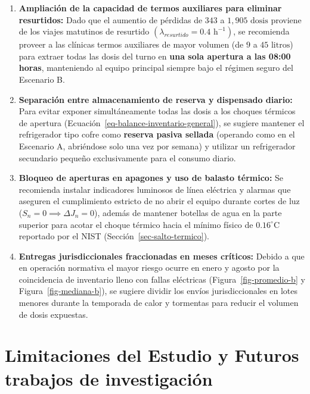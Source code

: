 \documentclass[
  spanish,
  us-letterpaper,
]{scrreprt}
\providecommand{\tightlist}{%
  \setlength{\itemsep}{0pt}\setlength{\parskip}{0pt}}
\numberwithin{equation}{section}
\theoremstyle{plain}
\theoremstyle{plain}
\theoremstyle{definition}
\theoremstyle{plain}
\theoremstyle{remark}
\begin{document}
\begin{enumerate}
\def\labelenumi{\arabic{enumi}.}
\tightlist
\item
  \textbf{Ampliación de la capacidad de termos auxiliares para eliminar
  resurtidos:} Dado que el aumentio de pérdidas de \(343\) a
  \(1,905\text{ dosis}\) proviene de los viajes matutinos de resurtido
  \(\left( \lambda_{resurtido} = 0.4\text{ h}^{-1} \right)\), se
  recomienda proveer a las clínicas termos auxiliares de mayor volumen
  (de \(9\) a \(45\text{ litros}\)) para extraer todas las dosis del
  turno en \textbf{una sola apertura a las 08:00 horas}, manteniendo al
  equipo principal siempre bajo el régimen seguro del Escenario B.
\item
  \textbf{Separación entre almacenamiento de reserva y dispensado
  diario:} Para evitar exponer simultáneamente todas las dosis a los
  choques térmicos de apertura
  (Ecuación~\ref{eq-balance-inventario-general}), se sugiere mantener el
  refrigerador tipo cofre como \textbf{reserva pasiva sellada} (operando
  como en el Escenario A, abriéndose solo una vez por semana) y utilizar
  un refrigerador secundario pequeño exclusivamente para el consumo
  diario.
\item
  \textbf{Bloqueo de aperturas en apagones y uso de balasto térmico:} Se
  recomienda instalar indicadores luminosos de línea eléctrica y alarmas
  que aseguren el cumplimiento estricto de no abrir el equipo durante
  cortes de luz (\(S_n = 0 \implies \Delta J_n = 0\)), además de
  mantener botellas de agua en la parte superior para acotar el choque
  térmico hacia el mínimo físico de \(0.16^\circ\text{C}\) reportado por
  el NIST (Sección~\ref{sec-salto-termico}).
\item
  \textbf{Entregas jurisdiccionales fraccionadas en meses críticos:}
  Debido a que en operación normativa el mayor riesgo ocurre en enero y
  agosto por la coincidencia de inventario lleno con fallas eléctricas
  (Figura~\ref{fig-promedio-b} y Figura~\ref{fig-mediana-b}), se sugiere
  dividir los envíos jurisdiccionales en lotes menores durante la
  temporada de calor y tormentas para reducir el volumen de dosis
  expuestas.
\end{enumerate}

\section{Limitaciones del Estudio y Futuros trabajos de
investigación}\label{limitaciones-del-estudio-y-futuros-trabajos-de-investigaciuxf3n}
\end{document}
